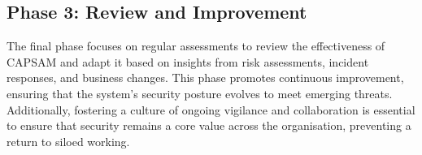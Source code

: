     \subsection{Phase 3: Review and Improvement}
    The final phase focuses on regular assessments to review the effectiveness of CAPSAM and adapt it based on insights from risk assessments, incident responses, and business changes. This phase promotes continuous improvement, ensuring that the system’s security posture evolves to meet emerging threats. Additionally, fostering a culture of ongoing vigilance and collaboration is essential to ensure that security remains a core value across the organisation, preventing a return to siloed working.